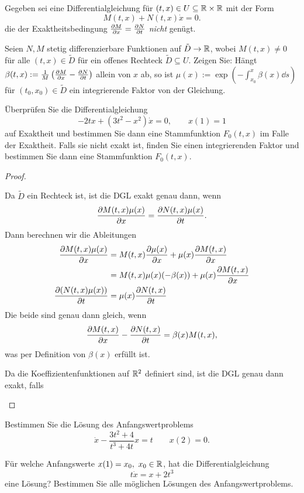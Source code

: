 \begin{Problem}
	Gegeben sei eine Differentialgleichung für $(t,x)\in U\subseteq \mathbb{R} \times \mathbb{R}$ mit der Form
	\[
		M(t, x)+N(t, x)\dot{x}=0
	.\] 
	die der Exaktheitsbedingung $\pdv{M}{x}=\pdv{N}{t}$ \emph{nicht} genügt.
	\begin{parts}
	\item Seien $N,M$ stetig differenzierbare Funktionen auf $\tilde{D}\to \mathbb{R}$, wobei $M(t, x)\neq 0$ f\"{u}r alle $(t,x)\in \tilde{D}$ f\"{u}r ein offenes Rechteck $\tilde{D}\subseteq U$. Zeigen Sie: H\"{a}ngt $\beta(t, x):=\frac{1}{M}\left( \pdv{M}{x}-\pdv{N}{t} \right) $ allein von $x$ ab, so ist $\mu(x):=\exp\left( -\int_{x_0}^x \beta(x)\dd{s} \right) $ f\"{u}r $(t_0, x_0)\in \tilde{D}$ ein integrierende Faktor von der Gleichung.
	\item \"{U}berpr\"{u}fen Sie die Differentialgleichung
		\[
			-2tx+(3t^2-x^2)\dot{x}=0,\qquad x(1)=1
		\]
		auf Exaktheit und bestimmen Sie dann eine Stammfunktion $F_0(t,x)$ im Falle der Exaktheit. Falls sie nicht exakt ist, finden Sie einen integrierenden Faktor und bestimmen Sie dann eine Stammfunktion $F_0(t,x)$.
	\end{parts}
\end{Problem}
\begin{proof}
	\begin{parts}
	\item Da $\tilde{D}$ ein Rechteck ist, ist die DGL exakt genau dann, wenn
	\[
		\pdv{M(t, x)\mu(x)}{x}=\pdv{N(t, x)\mu(x)}{t} 
	.\] 
	Dann berechnen wir die Ableitungen
	\begin{align*}
		\pdv{M(t, x)\mu(x)}{x}&= M(t, x)\pdv{\mu(x)}{x}+\mu(x)\pdv{M(t,x)}{x}\\
				      &=M(t, x)\mu(x)(-\beta(x))+\mu(x)\pdv{M(t,x)}{x}\\
		\pdv{(N(t,x)\mu(x))}{t}&=\mu(x)\pdv{N(t,x)}{t}
	\end{align*}
	Die beide sind genau dann gleich, wenn
	\[
		\pdv{M(t, x)}{x}-\pdv{N(t,x)}{t}=\beta(x)M(t,x)
	,\] 
	was per Definition von $\beta(x)$ erf\"{u}llt ist.
\item Da die Koeffizientenfunktionen auf $\mathbb{R}^2$ definiert sind, ist die DGL genau dann exakt, falls
\end{parts}
\end{proof}
\begin{Problem}
	\begin{parts}
	\item Bestimmen Sie die L\"{o}sung des Anfangswertproblems
		\[
			\dot{x}-\frac{3t^2+4}{t^3+4t}x=t\qquad x(2)=0
		.\] 
	\item F\"{u}r welche Anfangswerte $x(1)=x_0,~x_0\in \mathbb{R}$, hat die Differentialgleichung
		\[
			t\dot{x}=x+2t^3
		\]
		eine L\"{o}sung? Bestimmen Sie alle m\"{o}glichen L\"{o}sungen des Anfangswertproblems.
	\end{parts}
\end{Problem}
